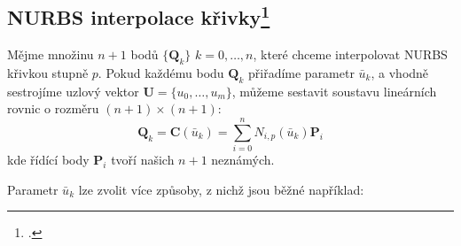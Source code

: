\subsection[NURBS interpolace křivky]{NURBS interpolace křivky\footcite[kapitola 9.2.1]{The_NURBS_Book}}\label{section: interpolace křivky}
Mějme množinu $n + 1$ bodů $\{\bm{Q}_k\}$ $k = 0, \ldots, n$, které chceme
interpolovat NURBS křivkou stupně $p$. Pokud každému bodu $\bm{Q}_k$ přiřadíme
parametr $\bar{u}_k$, a vhodně sestrojíme uzlový vektor $\bm{U} = \{u_0, \ldots,
    u_m\}$, můžeme sestavit soustavu lineárních rovnic o rozměru $(n + 1)\times(n +
    1)$:
\begin{equation}
    \bm{Q}_k = \bm{C}(\bar{u}_k) = \sum_{i = 0}^{n}N_{i,p}(\bar{u}_k)\bm{P}_i
\end{equation}
kde řídící body $\bm{P}_i$ tvoří našich $n + 1$ neznámých.\par
Parametr $\bar{u}_k$ lze zvolit více způsoby, z nichž jsou běžné například:
